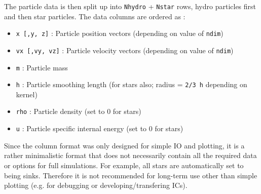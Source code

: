 \documentclass[a4paper]{article}
\newcommand{\var}[1]{\texttt{#1}}
\begin{document}
The particle data is then split up into \var{Nhydro} + \var{Nstar} rows, hydro particles first and then star particles.  The data columns are ordered as :
\begin{itemize}
\item \var{x [,y, z]} : Particle position vectors (depending on value of \var{ndim})
\item \var{vx [,vy, vz]} : Particle velocity vectors (depending on value of \var{ndim})
\item \var{m} : Particle mass
\item \var{h} : Particle smoothing length (for stars also; radius = \var{2/3\,h} depending on kernel)
\item \var{rho} : Particle density (set to 0 for stars)
\item \var{u} : Particle specific internal energy (set to 0 for stars)
\end{itemize}
Since the column format was only designed for simple IO and plotting, it is a rather minimalistic format that does not necessarily contain all the required data or options for full simulations.  For example, all stars are automatically set to being sinks.  Therefore it is not recommended for long-term use other than simple plotting (e.g. for debugging or developing/transfering ICs).



\end{document}
